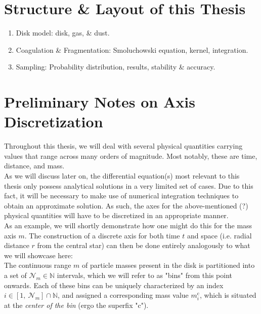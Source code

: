 \section{Structure \& Layout of this Thesis}

    \begin{enumerate}
        \item Disk model: disk, gas, \& dust.
        \item Coagulation \& Fragmentation: Smoluchowski equation, kernel, integration.
        \item Sampling: Probability distribution, results, stability \& accuracy.
    \end{enumerate}

\newpage
\section{Preliminary Notes on Axis Discretization}

    Throughout this thesis, we will deal with several physical quantities carrying values that 
    range across many orders of magnitude. Most notably, these are time, distance, and mass. \\

    As we will discuss later on, the differential equation(s) most relevant to this thesis only 
    possess analytical solutions in a very limited set of cases. Due to this fact, it will be
    necessary to make use of numerical integration techniques to obtain an approximate solution.
    As such, the axes for the above-mentioned (?) physical quantities will have to be discretized 
    in an appropriate manner. \\

    As an example, we will shortly demonstrate how one might do this for the mass axis $m$. The
    construction of a discrete axis for both time $t$ and space (i.e. radial distance $r$ from the
    central star) can then be done entirely analogously to what we will showcase here: \\

    The continuous range $m$ of particle masses present in the disk is partitioned into a set of 
    $\mathcal N_m\in\mathbb N$ intervals, which we will refer to as "bins" from this point onwards. 
    Each of these bins can be uniquely characterized by an index 
    $i\in[1,\ \mathcal N_m]\cap\mathbb N$, and assigned a corresponding mass value $m_i^\text{c}$, 
    which is situated at the \textit{center of the bin} (ergo the superfix "c").\\
    
